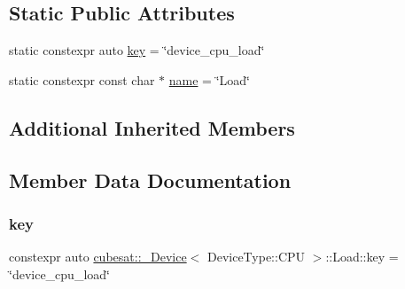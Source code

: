 \subsection*{Static Public Attributes}
\begin{DoxyCompactItemize}
\item 
static constexpr auto \hyperlink{structcubesat_1_1__Device_3_01DeviceType_1_1CPU_01_4_1_1Load_a8f5e0f4cb28809dbc33d1f52075a9f96}{key} = \char`\"{}device\+\_\+cpu\+\_\+load\char`\"{}
\item 
static constexpr const char $\ast$ \hyperlink{structcubesat_1_1__Device_3_01DeviceType_1_1CPU_01_4_1_1Load_a5b1066cfd4b0c4a79ee3b8492ba2a862}{name} = \char`\"{}Load\char`\"{}
\end{DoxyCompactItemize}
\subsection*{Additional Inherited Members}


\subsection{Member Data Documentation}
\mbox{\label{structcubesat_1_1__Device_3_01DeviceType_1_1CPU_01_4_1_1Load_a8f5e0f4cb28809dbc33d1f52075a9f96}} 
\subsubsection{\texorpdfstring{key}{key}}
{\footnotesize\ttfamily constexpr auto \hyperlink{structcubesat_1_1__Device}{cubesat\+::\+\_\+\+Device}$<$ Device\+Type\+::\+C\+PU $>$\+::Load\+::key = \char`\"{}device\+\_\+cpu\+\_\+load\char`\"{}\hspace{0.3cm}{\ttfamily [static]}}

\mbox{\label{structcubesat_1_1__Device_3_01DeviceType_1_1CPU_01_4_1_1Load_a5b1066cfd4b0c4a79ee3b8492ba2a862}} 
